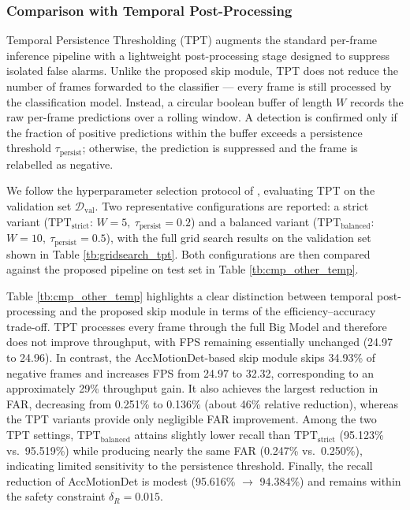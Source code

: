 \documentclass[
  10pt,
]{article}
\begin{document}
\subsubsection{Comparison with Temporal
Post-Processing}\label{sec:cmp-temporal}

Temporal Persistence Thresholding (TPT)
 augments the standard per-frame
inference pipeline with a lightweight post-processing stage designed to
suppress isolated false alarms. Unlike the proposed skip module, TPT
does not reduce the number of frames forwarded to the classifier ---
every frame is still processed by the classification model. Instead, a
circular boolean buffer of length \(W\) records the raw per-frame
predictions over a rolling window. A detection is confirmed only if the
fraction of positive predictions within the buffer exceeds a persistence
threshold \(\tau_\text{persist}\); otherwise, the prediction is
suppressed and the frame is relabelled as negative.





We follow the hyperparameter selection protocol of
, evaluating TPT on the validation
set \(\mathcal{D}_\text{val}\). Two representative configurations are
reported: a strict variant (\(\text{TPT}_\text{strict}\): \(W =
5,\ \tau_\text{persist} = 0.2\)) and a balanced variant
(\(\text{TPT}_\text{balanced}\): \(W = 10,\
\tau_\text{persist} = 0.5\)), with the full grid search results on the
validation set shown in Table \ref{tb:gridsearch_tpt}. Both
configurations are then compared against the proposed pipeline on test
set in Table \ref{tb:cmp_other_temp}.

Table \ref{tb:cmp_other_temp} highlights a clear distinction between
temporal post-processing and the proposed skip module in terms of the
efficiency--accuracy trade-off. TPT processes every frame through the
full Big Model and therefore does not improve throughput, with FPS
remaining essentially unchanged (24.97 to 24.96). In contrast, the
AccMotionDet-based skip module skips 34.93\% of negative frames and
increases FPS from 24.97 to 32.32, corresponding to an approximately
29\% throughput gain. It also achieves the largest reduction in FAR,
decreasing from 0.251\% to 0.136\% (about 46\% relative reduction),
whereas the TPT variants provide only negligible FAR improvement. Among
the two TPT settings, \(\text{TPT}_\text{balanced}\) attains slightly
lower recall than \(\text{TPT}_\text{strict}\) (95.123\% vs.~95.519\%)
while producing nearly the same FAR (0.247\% vs.~0.250\%), indicating
limited sensitivity to the persistence threshold. Finally, the recall
reduction of AccMotionDet is modest (95.616\% \(\to\) 94.384\%) and
remains within the safety constraint \(\delta_R = 0.015\).
\end{document}
